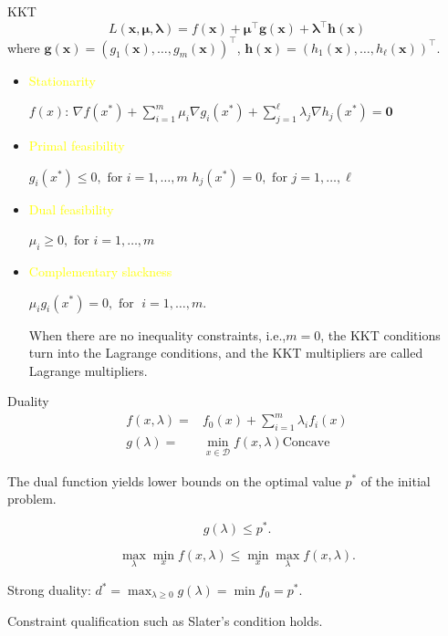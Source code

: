     \begin{frame}{KKT}
      \[L(\mathbf {x} ,\mathbf {\mu } ,\mathbf {\lambda } )=f(\mathbf {x} )+\mathbf {\mu } ^{\top }\mathbf {g} (\mathbf {x} )+\mathbf {\lambda } ^{\top }\mathbf {h} (\mathbf {x} ) \]
      \quad where $ \mathbf {g} (\mathbf {x} )=\left(g_{1}(\mathbf {x} ),\ldots ,g_{m}(\mathbf {x} )\right)^{\top } $, $ \mathbf {h} (\mathbf {x} )=\left(h_{1}(\mathbf {x} ),\ldots ,h_{\ell }(\mathbf {x} )\right)^{\top }$.

      \begin{itemize}
        \item \textcolor{yellow}{Stationarity}

        $ f(x) $: $ \nabla f(x^{*})+\sum _{i=1}^{m}\mu _{i}\nabla g_{i}(x^{*})+\sum _{j=1}^{\ell }\lambda _{j}\nabla h_{j}(x^{*})=\mathbf {0}$
        \item \textcolor{yellow}{Primal feasibility}

        $ g_{i}(x^{*})\leq 0,{\text{ for }}i=1,\ldots ,m $
        $ h_{j}(x^{*})=0,{\text{ for }}j=1,\ldots ,\ell \,\! $
        \item \textcolor{yellow}{Dual feasibility}

        $\mu _{i}\geq 0,{\text{ for }}i=1,\ldots ,m $
        \item \textcolor{yellow}{Complementary slackness}

        $ \mu _{i}g_{i}(x^{*})=0,{\text{ for }}\;i=1,\ldots ,m. $

        When there are no inequality constraints, i.e.,$ m=0 $, the KKT conditions turn into the Lagrange conditions, and the KKT multipliers are called Lagrange multipliers.
      \end{itemize}
    \end{frame}

    \begin{frame}{Duality}
      \begin{equation*}
        \begin{align}
        f(x,\lambda)=& f_{0}(x)+\sum_{i=1}^{m}\lambda_{i}f_{i}(x) \\
        g(\lambda)=& \min_{x\in {\mathcal {D}}}  f(x,\lambda) \text{Concave}
      \end{align}
      \end{equation*}

      The dual function yields lower bounds on the optimal value $p^{*}$
      of the initial problem.

      \[ g(\lambda)\leq p^{*} .\]

      \[\max_\lambda \min_x f(x,\lambda) \leq \min_x \max_\lambda f(x,\lambda).\]

      Strong duality: $ d^{*}=\max _{\lambda \geq 0}g(\lambda)=\min f_{0}=p^{*}$.

      Constraint qualification such as Slater's condition holds.
    \end{frame}

